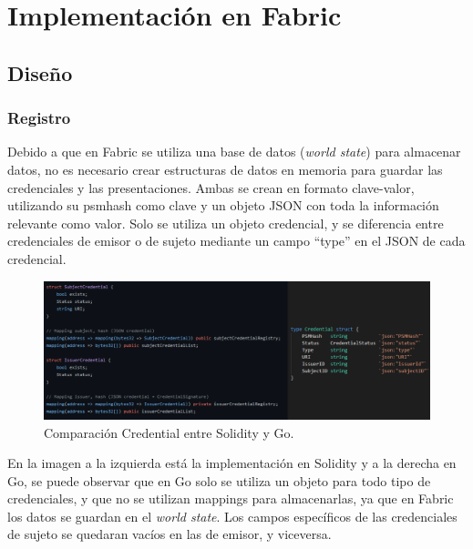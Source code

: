 \chapter{Implementación en Fabric}
\section{Diseño}
\subsection{Registro}
Debido a que en Fabric se utiliza una base de datos (\textit{world state}) para almacenar datos, no es necesario crear estructuras de datos en memoria para guardar las credenciales y las presentaciones. Ambas se crean en formato clave-valor, utilizando su \acrshort{psmhash} como clave y un objeto JSON con toda la información relevante como valor. Solo se utiliza un objeto credencial, y se diferencia entre credenciales de emisor o de sujeto mediante un campo ``type'' en el JSON de cada credencial.

\begin{figure}[H]
\centerline{\includegraphics[scale=0.55]{recursos/subjectcredential.png}}
\caption{Comparación Credential entre Solidity y Go.}
\label{credential-comp}
\end{figure}
En la imagen a la izquierda está la implementación en Solidity y a la derecha en Go, se puede observar que en Go solo se utiliza un objeto para todo tipo de credenciales, y que no se utilizan mappings para almacenarlas, ya que en Fabric los datos se guardan en el \textit{world state}. Los campos específicos de las credenciales de sujeto se quedaran vacíos en las de emisor, y viceversa.

